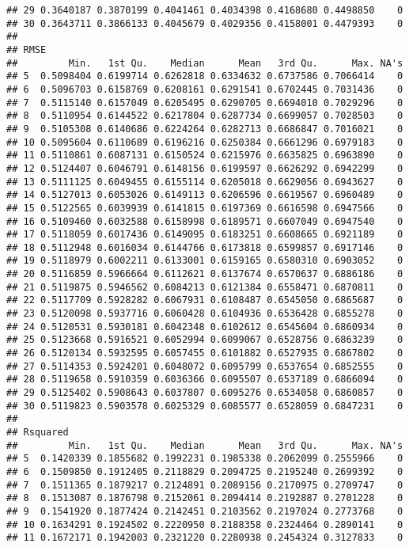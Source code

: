 \documentclass[
]{article}
\begin{document}
\begin{verbatim}
## 29 0.3640187 0.3870199 0.4041461 0.4034398 0.4168680 0.4498850    0
## 30 0.3643711 0.3866133 0.4045679 0.4029356 0.4158001 0.4479393    0
## 
## RMSE 
##         Min.   1st Qu.    Median      Mean   3rd Qu.      Max. NA's
## 5  0.5098404 0.6199714 0.6262818 0.6334632 0.6737586 0.7066414    0
## 6  0.5096703 0.6158769 0.6208161 0.6291541 0.6702445 0.7031436    0
## 7  0.5115140 0.6157049 0.6205495 0.6290705 0.6694010 0.7029296    0
## 8  0.5110954 0.6144522 0.6217804 0.6287734 0.6699057 0.7028503    0
## 9  0.5105308 0.6140686 0.6224264 0.6282713 0.6686847 0.7016021    0
## 10 0.5095604 0.6110689 0.6196216 0.6250384 0.6661296 0.6979183    0
## 11 0.5110861 0.6087131 0.6150524 0.6215976 0.6635825 0.6963890    0
## 12 0.5124407 0.6046791 0.6148156 0.6199597 0.6626292 0.6942299    0
## 13 0.5111125 0.6049455 0.6155114 0.6205018 0.6629056 0.6943627    0
## 14 0.5127013 0.6053026 0.6149113 0.6206596 0.6619567 0.6960489    0
## 15 0.5122565 0.6039939 0.6141815 0.6197369 0.6616598 0.6947566    0
## 16 0.5109460 0.6032588 0.6158998 0.6189571 0.6607049 0.6947540    0
## 17 0.5118059 0.6017436 0.6149095 0.6183251 0.6608665 0.6921189    0
## 18 0.5112948 0.6016034 0.6144766 0.6173818 0.6599857 0.6917146    0
## 19 0.5118979 0.6002211 0.6133001 0.6159165 0.6580310 0.6903052    0
## 20 0.5116859 0.5966664 0.6112621 0.6137674 0.6570637 0.6886186    0
## 21 0.5119875 0.5946562 0.6084213 0.6121384 0.6558471 0.6870811    0
## 22 0.5117709 0.5928282 0.6067931 0.6108487 0.6545050 0.6865687    0
## 23 0.5120098 0.5937716 0.6060428 0.6104936 0.6536428 0.6855278    0
## 24 0.5120531 0.5930181 0.6042348 0.6102612 0.6545604 0.6860934    0
## 25 0.5123668 0.5916521 0.6052994 0.6099067 0.6528756 0.6863239    0
## 26 0.5120134 0.5932595 0.6057455 0.6101882 0.6527935 0.6867802    0
## 27 0.5114353 0.5924201 0.6048072 0.6095799 0.6537654 0.6852555    0
## 28 0.5119658 0.5910359 0.6036366 0.6095507 0.6537189 0.6866094    0
## 29 0.5125402 0.5908643 0.6037807 0.6095276 0.6534058 0.6860857    0
## 30 0.5119823 0.5903578 0.6025329 0.6085577 0.6528059 0.6847231    0
## 
## Rsquared 
##         Min.   1st Qu.    Median      Mean   3rd Qu.      Max. NA's
## 5  0.1420339 0.1855682 0.1992231 0.1985338 0.2062099 0.2555966    0
## 6  0.1509850 0.1912405 0.2118829 0.2094725 0.2195240 0.2699392    0
## 7  0.1511365 0.1879217 0.2124891 0.2089156 0.2170975 0.2709747    0
## 8  0.1513087 0.1876798 0.2152061 0.2094414 0.2192887 0.2701228    0
## 9  0.1541920 0.1877424 0.2142451 0.2103562 0.2197024 0.2773768    0
## 10 0.1634291 0.1924502 0.2220950 0.2188358 0.2324464 0.2890141    0
## 11 0.1672171 0.1942003 0.2321220 0.2280938 0.2454324 0.3127833    0

\end{verbatim}
\end{document}
